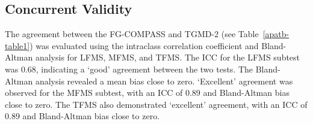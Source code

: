 \documentclass[
  man,
  colorlinks=true,linkcolor=blue,citecolor=blue,urlcolor=blue]{apa7}
\begin{document}
\hypertarget{concurrent-validity}{%
\subsection{Concurrent Validity}\label{concurrent-validity}}

The agreement between the FG-COMPASS and TGMD-2 (see
Table~\ref{apatb-table1}) was evaluated using the intraclass correlation
coefficient and Bland-Altman analysis for LFMS, MFMS, and TFMS. The ICC
for the LFMS subtest was 0.68, indicating a `good' agreement between the
two tests. The Bland-Altman analysis revealed a mean bias close to zero.
`Excellent' agreement was observed for the MFMS subtest, with an ICC of
0.89 and Bland-Altman bias close to zero. The TFMS also demonstrated
`excellent' agreement, with an ICC of 0.89 and Bland-Altman bias close
to zero.
\end{document}
